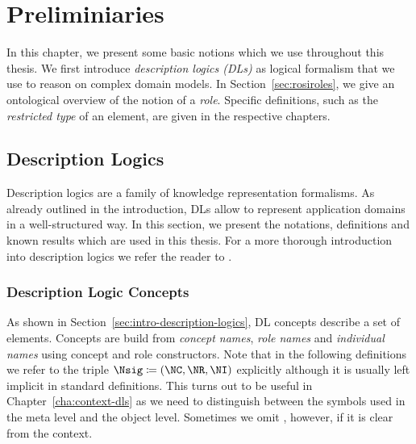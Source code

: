 
\chapter{Preliminiaries}
\label{cha:preliminiaries}

In this chapter, we present some basic notions which we use throughout this thesis. We first
introduce \emph{description logics (DLs)} as logical formalism that we use to reason on complex
domain models. In Section~\ref{sec:rosiroles}, we give an ontological overview of the notion of a
\emph{role}.
%
Specific definitions, such as the \emph{restricted type} of an element, are given in the respective
chapters.



\section{Description Logics}
\label{sec:description-logics}

Description logics are a family of knowledge representation formalisms. As already outlined in the
introduction, DLs allow to represent application domains in a well-structured way. In this section,
we present the notations, definitions and known results which are used in this thesis.
%
For a more thorough introduction into description logics we refer the reader to
\cite{DLhandbook-07}.

\subsection{Description Logic Concepts}
\label{sec:dl-concepts}

As shown in Section~\ref{sec:intro-description-logics}, DL concepts describe a set of
elements. Concepts are build from \emph{concept names}, \emph{role names} and \emph{individual
  names} using concept and role constructors.  Note that in the following definitions we refer to
the triple $\Nsig \coloneqq (\NC, \NR, \NI)$ explicitly although it is usually left implicit in
standard definitions.  This turns out to be useful in Chapter~\ref{cha:context-dls} as we need to
distinguish between the symbols used in the meta level and the object level.  Sometimes we omit
\Nsig, however, if it is clear from the context.
%

